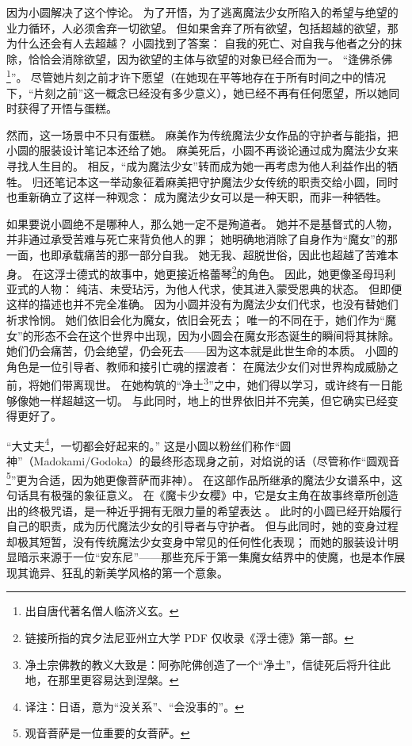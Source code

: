因为小圆解决了这个悖论。
为了开悟，为了逃离魔法少女所陷入的希望与绝望的业力循环，人必须舍弃一切欲望。
但如果舍弃了所有欲望，包括超越的欲望，那为什么还会有人去超越？
小圆找到了答案：
自我的死亡、对自我与他者之分的抹除，恰恰会消除欲望，因为欲望的主体与欲望的对象已经合而为一。
“逢佛杀佛\footnote{%
    出自唐代著名僧人临济义玄。
}\cite{watson1999lin-chi}”。
尽管她片刻之前才许下愿望（在她现在平等地存在于所有时间之中的情况下，“片刻之前”这一概念已经没有多少意义），她已经不再有任何愿望，所以她同时获得了开悟与蛋糕。

然而，这一场景中不只有蛋糕。
麻美作为传统魔法少女作品的守护者与能指，把小圆的服装设计笔记本还给了她。
麻美死后，小圆不再谈论通过成为魔法少女来寻找人生目的。
相反，“成为魔法少女”转而成为她一再考虑为他人利益作出的牺牲。
归还笔记本这一举动象征着麻美把守护魔法少女传统的职责交给小圆，同时也重新确立了这样一种观念：
成为魔法少女可以是一种天职，而非一种牺牲。

如果要说小圆绝不是哪种人，那么她一定不是殉道者。
她并不是基督式的人物，并非通过承受苦难与死亡来背负他人的罪；
她明确地消除了自身作为“魔女”的那一面，也即承载痛苦的那一部分自我。
她无我、超脱世俗，因此也超越了苦难本身。
在这浮士德式的故事中，她更接近格蕾琴\footnote{%
    链接所指的宾夕法尼亚州立大学 PDF 仅收录《浮士德》第一部。
}\cite{goethe2005faust}的角色。
因此，她更像圣母玛利亚式的人物：
纯洁、未受玷污，为他人代求，使其进入蒙受恩典的状态。
但即便这样的描述也并不完全准确。
因为小圆并没有为魔法少女们代求，也没有替她们祈求怜悯。
她们依旧会化为魔女，依旧会死去；
唯一的不同在于，她们作为“魔女”的形态不会在这个世界中出现，因为小圆会在魔女形态诞生的瞬间将其抹除。
她们仍会痛苦，仍会绝望，仍会死去——因为这本就是此世生命的本质。
小圆的角色是一位引导者、教师和接引亡魂的摆渡者：
在魔法少女们对世界构成威胁之前，将她们带离现世。
在她构筑的“净土\footnote{%
    净土宗佛教的教义大致是：阿弥陀佛创造了一个“净土”，信徒死后将升往此地，在那里更容易达到涅槃。
}”\cite{smart1998pure-land}之中，她们得以学习，或许终有一日能够像她一样超越这一切。
与此同时，地上的世界依旧并不完美，但它确实已经变得更好了。

“大丈夫\footnote{%
    译注：日语，意为“没关系”、“会没事的”。
}，一切都会好起来的。”
这是小圆以粉丝们称作“圆神”（Madokami/Godoka）的最终形态现身之前，对焰说的话（尽管称作“圆观音\footnote{%
    观音菩萨是一位重要的女菩萨。
}”\cite{smart1998pure-land}更为合适，因为她更像菩萨而非神）。
在这部作品所继承的魔法少女谱系中，这句话具有极强的象征意义。
在《魔卡少女樱》中，它是女主角在故事终章所创造出的终极咒语，是一种近乎拥有无限力量的希望表达
\cite{cardcaptor-sakura-true-feelings}。
此时的小圆已经开始履行自己的职责，成为历代魔法少女的引导者与守护者。
但与此同时，她的变身过程却极其短暂，没有传统魔法少女变身中常见的任何性化表现；
而她的服装设计明显暗示来源于一位“安东尼”——那些充斥于第一集魔女结界中的使魔，也是本作展现其诡异、狂乱的新美学风格的第一个意象。%

